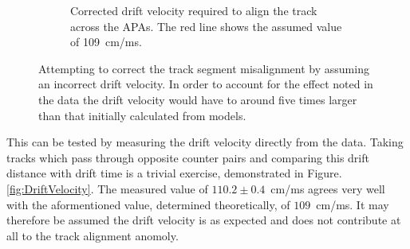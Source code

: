 \begin{figure}
\begin{subfigure}[t]{0.48\linewidth}
    \caption{Corrected drift velocity required to align the track across the APAs.  The red line shows the assumed value of 109~cm/ms.}
    \label{fig:TrackMisalignmentDriftVelocityRes}
  \end{subfigure}
  \caption[Attempting to correct the track segment misalignment by assuming an incorrect drift velocity.]{Attempting to correct the track segment misalignment by assuming an incorrect drift velocity.  In order to account for the effect noted in the data the drift velocity would have to around five times larger than that initially calculated from models.}
  \label{fig:TrackMisalignmentDriftVelocity}
\end{figure}

This can be tested by measuring the drift velocity directly from the data.  Taking tracks which pass through opposite counter pairs and comparing this drift distance with drift time is a trivial exercise, demonstrated in Figure. \ref{fig:DriftVelocity}.  The measured value of $110.2\pm0.4$~cm/ms agrees very well with the aformentioned value, determined theoretically, of $109$~cm/ms.  It may therefore be assumed the drift velocity is as expected and does not contribute at all to the track alignment anomoly.

